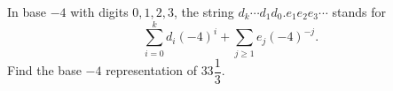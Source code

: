 In base $-4$ with digits $0,1,2,3$, the string $d_k\cdots d_1d_0.e_1e_2e_3\cdots$ stands for
\[\sum_{i=0}^{k}d_i(-4)^i+\sum_{j\ge1}e_j(-4)^{-j}.\]
Find the base $-4$ representation of $33\dfrac13$.
